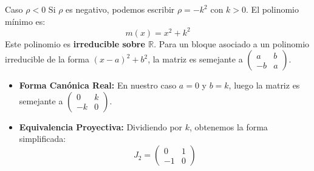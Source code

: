{ Caso $\rho < 0$
Si $\rho$ es negativo, podemos escribir $\rho = -k^2$ con $k > 0$. El polinomio mínimo es:
$$ m(x) = x^2 + k^2 $$
Este polinomio es \textbf{irreducible sobre $\mathbb{R}$}. Para un bloque asociado a un polinomio irreducible de la forma $(x-a)^2 + b^2$, la matriz es semejante a $\begin{pmatrix} a & b \\ -b & a \end{pmatrix}$.
\begin{itemize}
    \item \textbf{Forma Canónica Real:} En nuestro caso $a=0$ y $b=k$, luego la matriz es semejante a $\begin{pmatrix} 0 & k \\ -k & 0 \end{pmatrix}$.
    \item \textbf{Equivalencia Proyectiva:} Dividiendo por $k$, obtenemos la forma simplificada:
    \[ J_2 = \begin{pmatrix} 0 & 1 \\ -1 & 0 \end{pmatrix} \]
\end{itemize}
}

